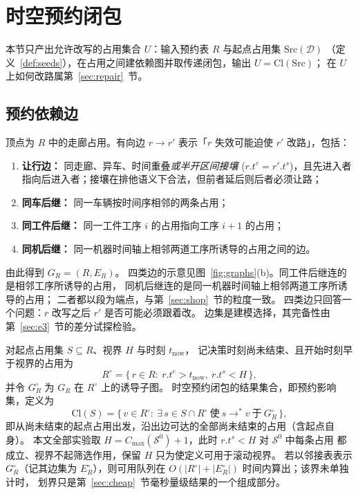 \section{时空预约闭包}
\label{sec:strc}

本节只产出允许改写的占用集合 \(U\)：输入预约表 \(R\) 与起点占用集 \(\mathrm{Src}(\mathcal{D})\)
（定义~\ref{def:seeds}），在占用之间建依赖图并取传递闭包，输出 \(U=\mathrm{Cl}(\mathrm{Src})\)；
在 \(U\) 上如何改路属第~\ref{sec:repair}~节。

\subsection{预约依赖边}
\label{sec:closure_def}

\begin{definition}[预约依赖图]
\label{def:dep}
顶点为 \(R\) 中的走廊占用。有向边 \(r\to r'\) 表示「\(r\) 失效可能迫使 \(r'\) 改路」，包括：
\begin{enumerate}[leftmargin=1.4em,itemsep=0.15em]
\item \textbf{让行边：} 同走廊、异车、时间重叠\emph{或半开区间接壤}
(\(r.t^e=r'.t^s\))，且先进入者指向后进入者；接壤在排他语义下合法，但前者延后则后者必须让路；
\item \textbf{同车后继：} 同一车辆按时间序相邻的两条占用；
\item \textbf{同工件后继：} 同一工件工序 \(i\) 的占用指向工序 \(i+1\) 的占用；
\item \textbf{同机后继：} 同一机器时间轴上相邻两道工序所诱导的占用之间的边。
\end{enumerate}
由此得到 \(G_R=(R,E_R)\)。
四类边的示意见图~\ref{fig:graphs}(b)。同工件后继连的是相邻工序所诱导的占用，
同机后继连的是同一机器时间轴上相邻两道工序所诱导的占用；
二者都以段为端点，与第~\ref{sec:shop}~节的粒度一致。
四类边只回答一个问题：\(r\) 改写之后 \(r'\) 是否可能必须跟着改。
边集是建模选择，其完备性由第~\ref{sec:e3}~节的差分试探检验。
\end{definition}

\begin{definition}[\STRC{}]
\label{def:strc}
对起点占用集 \(S\subseteq R\)、视界 \(H\) 与时刻 \(t_{\mathrm{now}}\)，
记决策时刻尚未结束、且开始时刻早于视界的占用为
\[
R^{\circ}=\bigl\{\,r\in R:\ r.t^e>t_{\mathrm{now}},\ r.t^s<H\,\bigr\},
\]
并令 \(G_R^\circ\) 为 \(G_R\) 在 \(R^{\circ}\) 上的诱导子图。
时空预约闭包的结果集合，即预约影响集，定义为
\[
\mathrm{Cl}(S)
=\bigl\{\,v\in R^{\circ}:\
\exists\,s\in S\cap R^{\circ}\ \text{使}\ s\!\to^*\!v\ \text{于}\ G_R^\circ\,\bigr\},
\]
即从尚未结束的起点占用出发，沿出边可达的全部尚未结束的占用（含起点自身）。
本文全部实验取 \(H=C_{\max}(\mathcal{S}^0)+1\)，此时 \(r.t^s<H\) 对 \(\mathcal{S}^0\) 中每条占用
都成立、视界不起筛选作用，保留 \(H\) 只为使定义可用于滚动视界。
若以邻接表表示 \(G_R^\circ\)（记其边集为 \(E_R^{\circ}\)），则可用队列在
\(O(|R^{\circ}|+|E_R^{\circ}|)\) 时间内算出；该界未单独计时，
划界只是第~\ref{sec:cheap}~节毫秒量级结果的一个组成部分。
\end{definition}


